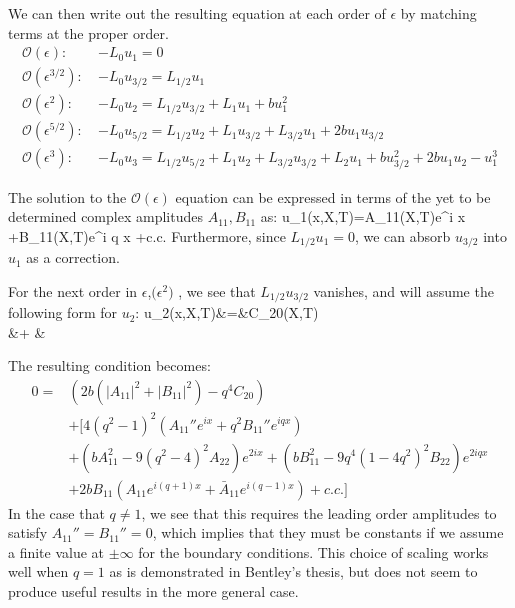 \documentclass[../main/WavelengthCompetition.tex]{subfiles}
\begin{document}
We can then write out the resulting equation at each order of $\epsilon$ by matching terms at the proper order.
\begin{subequations}
\begin{align}
\mathcal{O}(\epsilon): \:  &-L_0 u_1 =0
\label{eq:msh23o1b} \\
\mathcal{O}(\epsilon^{3/2}): \: &-L_0 u_{3/2} = L_{1/2} u_1 
\label{eq:msh23o15b} \\
\mathcal{O}(\epsilon^2): \:  &-L_0 u_2 = L_{1/2} u_{3/2} +L_1 u_1 +b u_1^2
\label{eq:msh23o2b}\\
\mathcal{O}(\epsilon^{5/2}): \:  &-L_0 u_{5/2} = L_{1/2} u_{2} +L_1 u_{3/2}+ L_{3/2} u_1 +2b u_1 u_{3/2}
\label{eq:msh23o25b}\\
\mathcal{O}(\epsilon^{3}): \:  &-L_0 u_{3} = L_{1/2} u_{5/2} +L_1 u_{2}+ L_{3/2} u_{3/2}+L_2 u_1   +b u_{3/2}^2+2b u_1 u_2 -u_1^3
\label{eq:msh23o25b}
\end{align}
\end{subequations}

The solution to the $\mathcal{O}(\epsilon)$ equation can be expressed in terms of the yet to be determined complex amplitudes $A_{11}, B_{11}$ as:
\beqn
u_1(x,X,T)=A_{11}(X,T)e^{i x} +B_{11}(X,T)e^{i q x} +c.c.
\label{eq:sol23o1}
\eeqn
Furthermore, since $L_{1/2} u_1=0$, we can absorb $u_{3/2}$ into $u_1$ as a correction. 

For the next order in $\epsilon$,$\mathcal(\epsilon^2)$ , we see that $L_{1/2} u_{3/2}$ vanishes, and will assume the following form for $u_2$:
\beqa
u_2(x,X,T)&=&C_{20}(X,T)  \\
&+ &\left[ A_{21}(X,T)e^{i x}+A_{22}(X,T)e^{2 i x} +B_{21}(X,T)e^{i q x} + B_{22}(X,T)e^{2 i q x} +c.c.\right]\nonumber
\label{eq:sol23o2}
\eeqa

The resulting condition becomes:
\begin{align}
	0=& \left(2 b (|A_{11}|^2+|B_{11}|^2)-q^4 C_{20} \right) \nonumber \\
&+\biggl[ 4(q^2-1)^2\left( A_{11}''e^{ix}+q^2 B_{11}''e^{iqx} \right)\nonumber \\
 &+\left(b A_{11}^2-9(q^2-4)^2A_{22}\right)e^{2 i x} +\left(b B_{11}^2-9q^4 (1-4q^2)^2 B_{22}\right)e^{2 i q x} \nonumber \\
&+2b B_{11}\left(A_{11}e^{i(q+1)x}+\bar{A}_{11}e^{i(q-1)x} \right)+ c.c.\biggr]
\label{eq:solvability2}
\end{align}
In the case that $q\neq 1$, we see that this requires the leading order amplitudes to satisfy $A_{11}''=B_{11}''=0$, which implies that they must be constants if we assume a finite value at $\pm \infty$ for the boundary conditions.  This choice of scaling works well when $q=1$ as is demonstrated in Bentley's thesis, but does not seem to produce useful results in the more general case. 
\end{document}
